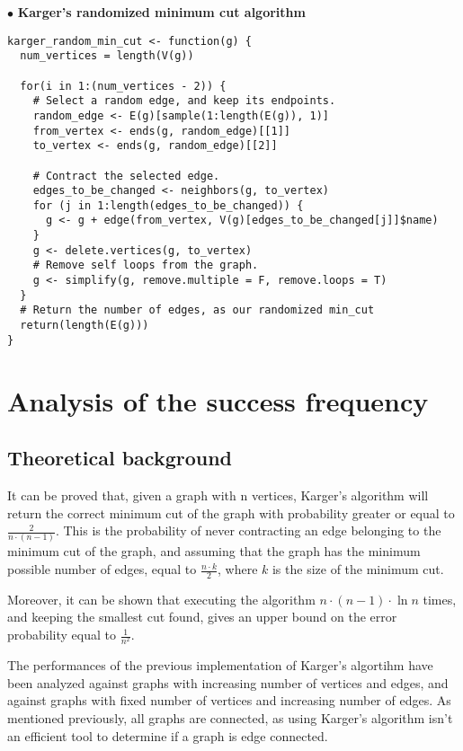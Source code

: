 \documentclass[
12pt,
a4paper,
oneside,
headinclude,
footinclude]{article}
\begin{document}
\newpage
$\bullet$ \textbf{Karger's randomized minimum cut algorithm}
\begin{lstlisting}
karger_random_min_cut <- function(g) {
  num_vertices = length(V(g))

  for(i in 1:(num_vertices - 2)) {
    # Select a random edge, and keep its endpoints.
    random_edge <- E(g)[sample(1:length(E(g)), 1)]
    from_vertex <- ends(g, random_edge)[[1]]
    to_vertex <- ends(g, random_edge)[[2]]

    # Contract the selected edge.
    edges_to_be_changed <- neighbors(g, to_vertex)
    for (j in 1:length(edges_to_be_changed)) {
      g <- g + edge(from_vertex, V(g)[edges_to_be_changed[j]]$name)
    }
    g <- delete.vertices(g, to_vertex)
	# Remove self loops from the graph.
    g <- simplify(g, remove.multiple = F, remove.loops = T)
  }
  # Return the number of edges, as our randomized min_cut
  return(length(E(g)))
}
\end{lstlisting}

\section{Analysis of the success frequency}

\subsection{Theoretical background}

It can be proved that, given a graph with n vertices, Karger's algorithm will
return the correct minimum cut of the graph with probability greater or equal to $\frac{2}{n \cdot (n - 1)}$.
This is the probability of never contracting an edge belonging to the minimum cut of the graph,
and assuming that the graph has the minimum possible number of edges, equal to $\frac{n \cdot k}{2}$, where $k$ is the size of the minimum cut.

Moreover, it can be shown that executing the algorithm $n \cdot (n - 1) \cdot \ln{n}$ times, and keeping the smallest cut found,
gives an upper bound on the error probability equal to $\frac{1}{n^{2}}$.

The performances of the previous implementation of Karger's algortihm have been analyzed against graphs with increasing number of vertices and edges,
and against graphs with fixed number of vertices and increasing number of edges.
As mentioned previously, all graphs are connected, as using Karger's algorithm isn't an efficient tool to determine if a graph is edge connected.
\end{document}
